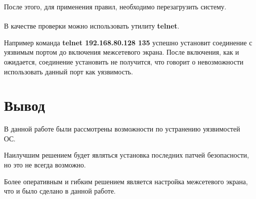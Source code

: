 \documentclass[14pt,a4paper,report]{report}
\begin{document}
После этого, для применения правил, необходимо перезагрузить систему.\\\\
В качестве проверки можно использовать утилиту \textbf{telnet}. 

Например команда \textbf{telnet 192.168.80.128 135} успешно установит соединение с уязвимым портом до включения межсетевого экрана. После включения, как и ожидается, соединение установить не получится, что говорит о невозможности использовать данный порт как уязвимость.

\section*{Вывод}
В данной работе были рассмотрены возможности по устранению уязвимостей ОС.

Наилучшим решением будет являться установка последних патчей безопасности, но это не всегда возможно. 

Более оперативным и гибким решением является настройка межсетевого экрана, что и было сделано в данной работе.

%
%
\end{document}
